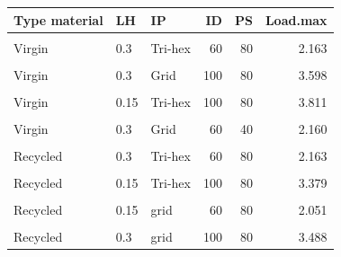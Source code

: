 \documentclass[conference,final,]{IEEEtran}
\begin{document}
\begin{table}
\centering
\begin{tabular}[t]{lllrrr}
\toprule
Type material & LH & IP & ID & PS & Load.max\\
\midrule
\cellcolor{gray!6}{Virgin} & \cellcolor{gray!6}{0.15} & \cellcolor{gray!6}{Tri-hex} & \cellcolor{gray!6}{60} & \cellcolor{gray!6}{40} & \cellcolor{gray!6}{2.206}\\
Virgin & 0.3 & Tri-hex & 60 & 80 & 2.163\\
\cellcolor{gray!6}{Virgin} & \cellcolor{gray!6}{0.15} & \cellcolor{gray!6}{Grid} & \cellcolor{gray!6}{60} & \cellcolor{gray!6}{80} & \cellcolor{gray!6}{2.240}\\
Virgin & 0.3 & Grid & 100 & 80 & 3.598\\
\cellcolor{gray!6}{Virgin} & \cellcolor{gray!6}{0.3} & \cellcolor{gray!6}{Tri-hex} & \cellcolor{gray!6}{100} & \cellcolor{gray!6}{40} & \cellcolor{gray!6}{3.620}\\
Virgin & 0.15 & Tri-hex & 100 & 80 & 3.811\\
\cellcolor{gray!6}{Virgin} & \cellcolor{gray!6}{0.15} & \cellcolor{gray!6}{Grid} & \cellcolor{gray!6}{100} & \cellcolor{gray!6}{40} & \cellcolor{gray!6}{3.793}\\
Virgin & 0.3 & Grid & 60 & 40 & 2.160\\
\cellcolor{gray!6}{Recycled} & \cellcolor{gray!6}{0.15} & \cellcolor{gray!6}{Tri-hex} & \cellcolor{gray!6}{60} & \cellcolor{gray!6}{40} & \cellcolor{gray!6}{2.163}\\
Recycled & 0.3 & Tri-hex & 60 & 80 & 2.163\\
\cellcolor{gray!6}{Recycled} & \cellcolor{gray!6}{0.3} & \cellcolor{gray!6}{grid} & \cellcolor{gray!6}{60} & \cellcolor{gray!6}{40} & \cellcolor{gray!6}{2.152}\\
Recycled & 0.15 & Tri-hex & 100 & 80 & 3.379\\
\cellcolor{gray!6}{Recycled} & \cellcolor{gray!6}{0.3} & \cellcolor{gray!6}{Tri-hex} & \cellcolor{gray!6}{100} & \cellcolor{gray!6}{40} & \cellcolor{gray!6}{3.370}\\
Recycled & 0.15 & grid & 60 & 80 & 2.051\\
\cellcolor{gray!6}{Recycled} & \cellcolor{gray!6}{0.15} & \cellcolor{gray!6}{grid} & \cellcolor{gray!6}{100} & \cellcolor{gray!6}{40} & \cellcolor{gray!6}{3.525}\\
Recycled & 0.3 & grid & 100 & 80 & 3.488\\
\bottomrule
\end{tabular}
\end{table}
\end{document}
